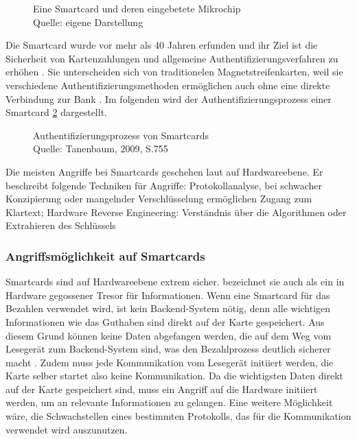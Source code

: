 \begin{figure}[H]
   \caption{Eine Smartcard und deren eingebetete Mikrochip\\Quelle: eigene Darstellung}
   \label{fig:eigenes_Bild}
\end{figure}

Die Smartcard wurde vor mehr als 40 Jahren erfunden und ihr Ziel ist die Sicherheit von Kartenzahlungen und 
allgemeine Authentifizierungsverfahren zu erhöhen \cite{refip:JFSB}. Sie unterscheiden sich von traditionelen 
Magnetstreifenkarten, weil sie verschiedene Authentifizierungsmethoden ermöglichen auch ohne eine direkte 
Verbindung zur Bank \cite{refbook:ATMS}. Im folgenden wird der Authentifizierungsprozess einer Smartcard 
\ref{fig:refbook_ATMS} dargestellt. 

\begin{figure}[H]
   \caption{Authentifizierungsprozess von Smartcards\\Quelle: Tanenbaum, 2009, S.755}
   \label{fig:refbook_ATMS}
\end{figure}

Die meisten Angriffe bei Smartcards geschehen laut \cite{refmas:ASSS} auf Hardwareebene. Er beschreibt folgende 
Techniken für Angriffe: Protokollanalyse, bei schwacher Konzipierung oder mangelnder Verschlüsselung ermöglichen Zugang 
zum Klartext; Hardware Reverse Engineering: Verständnis über die Algorithmen oder Extrahieren des Schlüssels


\subsubsection{Angriffsmöglichkeit auf Smartcards}
Smartcards sind auf Hardwareebene extrem sicher. \cite{refmas:ASSS} bezeichnet sie auch als ein in Hardware gegossener
Tresor für Informationen. Wenn eine Smartcard für das Bezahlen verwendet wird, ist kein Backend-System nötig,
denn alle wichtigen Informationen wie das Guthaben sind direkt auf der Karte gespeichert. Aus diesem Grund können
keine Daten abgefangen werden, die auf dem Weg vom Lesegerät zum Backend-System sind, was den Bezahlprozess
deutlich sicherer macht \cite{refbook:WRHC}. Zudem muss jede Kommunikation vom Lesegerät initiiert werden, 
die Karte selber startet also keine Kommunikation. Da die wichtigsten Daten direkt auf der Karte gespeichert sind,
muss ein Angriff auf die Hardware initiiert werden, um an relevante Informationen zu gelangen. Eine weitere 
Möglichkeit wäre, die Schwachstellen eines bestimmten Protokolls, das für die Kommunikation verwendet wird auszunutzen.

